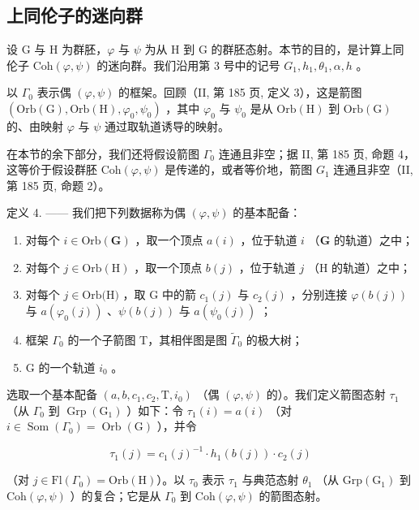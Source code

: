 \subsection{上同伦子的迷向群}

设 G 与 H 为群胚，\(\varphi\) 与 \(\psi\) 为从 H 到 G 的群胚态射。本节的目的，是计算上同伦子 \(\mathrm{Coh}(\varphi, \psi)\) 的迷向群。我们沿用第 3 号中的记号 \(G_1, h_1, \theta_1, \alpha, h\) 。

以 \(\Gamma_{0}\) 表示偶 \((\varphi,\psi)\) 的框架。回顾（II, 第 185 页, 定义 3），这是箭图 \((\mathrm{Orb}(\mathrm{G}),\mathrm{Orb}(\mathrm{H}),\varphi_{0},\psi_{0})\) ，其中 \(\varphi_{0}\) 与 \(\psi_{0}\) 是从 \(\mathrm{Orb}(\mathrm{H})\) 到 \(\mathrm{Orb}(\mathrm{G})\) 的、由映射 \(\varphi\) 与 \(\psi\) 通过取轨道诱导的映射。

在本节的余下部分，我们还将假设箭图 \(\Gamma_{0}\) 连通且非空；据 II, 第 185 页, 命题 4，这等价于假设群胚 \(\mathrm{Coh}(\varphi,\psi)\) 是传递的，或者等价地，箭图 \(G_{1}\) 连通且非空（II, 第 185 页, 命题 2）。

定义 4. —— 我们把下列数据称为偶 \((\varphi, \psi)\) 的基本配备：

\begin{enumerate}
\def\labelenumi{(\roman{enumi})}
\item
  对每个 \(i \in \mathrm{Orb}(\mathbf{G})\) ，取一个顶点 \(a(i)\) ，位于轨道 \(i\) （\(\mathbf{G}\) 的轨道）之中；
\item
  对每个 \(j \in \mathrm{Orb}(\mathrm{H})\) ，取一个顶点 \(b(j)\) ，位于轨道 \(j\) （H 的轨道）之中；
\item
  对每个 \(j \in \text{Orb(H)}\) ，取 G 中的箭 \(c_{1}(j)\) 与 \(c_{2}(j)\) ，分别连接 \(\varphi(b(j))\) 与 \(a(\varphi_{0}(j))\) 、\(\psi(b(j))\) 与 \(a(\psi_{0}(j))\) ；
\item
  框架 \(\Gamma_{0}\) 的一个子箭图 T，其相伴图是图 \(\widetilde{\Gamma}_{0}\) 的极大树；
\item
  G 的一个轨道 \(i_{0}\) 。
\end{enumerate}

选取一个基本配备 \((a,b,c_{1},c_{2},\mathrm{T},i_{0})\) （偶 \((\varphi,\psi)\) 的）。我们定义箭图态射 \(\tau_{1}\) （从 \(\Gamma_{0}\) 到 \(\operatorname{Grp}(\mathrm{G}_{1})\) ）如下：令 \(\tau_{1}(i)=a(i)\) （对 \(i\in\operatorname{Som}(\Gamma_{0})=\operatorname{Orb}(\mathrm{G})\) ），并令

\[
\tau_ {1} (j) = c _ {1} (j) ^ {- 1} \cdot h _ {1} (b (j)) \cdot c _ {2} (j)
\]

（对 \(j \in \mathrm{Fl}(\Gamma_{0}) = \mathrm{Orb}(\mathrm{H})\)）。以 \(\tau_{0}\) 表示 \(\tau_{1}\) 与典范态射 \(\theta_{1}\) （从 \(\mathrm{Grp}(\mathrm{G}_{1})\) 到 \(\mathrm{Coh}(\varphi, \psi)\) ）的复合；它是从 \(\Gamma_{0}\) 到 \(\mathrm{Coh}(\varphi, \psi)\) 的箭图态射。

